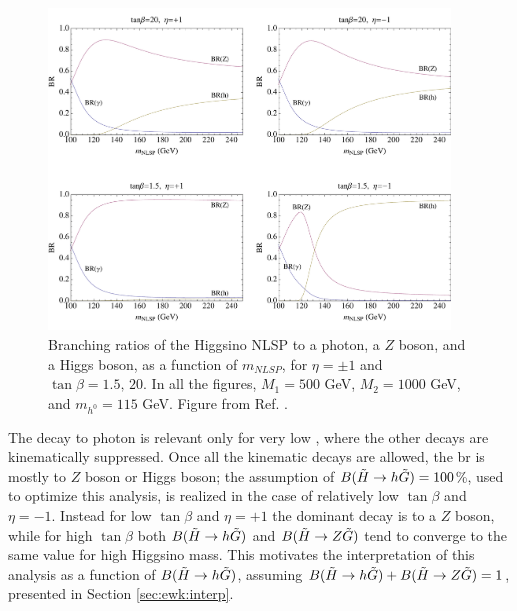 \begin{figure}[h]
	\centering
	\includegraphics[width=0.95\textwidth]{figures/ewk_prod/varie/BRfracs}
\caption{Branching ratios of the Higgsino NLSP to a photon, a $Z$ boson, and a Higgs boson, as a function of $m_{NLSP}$, for $\eta=\pm1$ and $\tan\beta=1.5,\,20$. In all the figures, $M_1=500$ GeV, $M_2=1000$ GeV, and $m_{h^0}=115$ GeV. Figure from Ref. \cite{Meade:2009qv}.}
\label{fig:HiggsinoBR}
\end{figure}

The decay to photon is relevant only for very low \mhino, where the other decays are kinematically suppressed. 
Once all the kinematic decays are allowed, the \gls{br} is mostly to $Z$ boson or Higgs boson; 
the assumption of $B(\tilde{H}\rightarrow h \tilde{G}) = 100$\%, used to optimize this analysis, is 
realized in the case of relatively low $\tan \beta$ and $\eta = -1$.
Instead for low $\tan \beta$ and $\eta = +1$ the dominant decay is to a $Z$ boson, while for high 
$\tan \beta$ both $B(\tilde{H}\rightarrow h \tilde{G})$ and $B(\tilde{H}\rightarrow Z \tilde{G})$ tend to 
converge to the same value for high Higgsino mass.
This motivates the interpretation of this analysis as a function of $B(\tilde{H}\rightarrow h \tilde{G})$, 
assuming $B(\tilde{H}\rightarrow h \tilde{G}) +B(\tilde{H}\rightarrow Z \tilde{G}) =1$, presented in Section \ref{sec:ewk:interp}.




